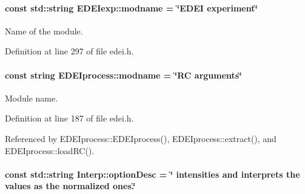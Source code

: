 \hypertarget{group__edeiedei_ga6dfda2e4cb9d61720e2db926b65d6dbe}{
\paragraph[{modname}]{\setlength{\rightskip}{0pt plus 5cm}const std::string {\bf EDEIexp::modname} = \char`\"{}EDEI experiment\char`\"{}}\hfill}
\label{group__edeiedei_ga6dfda2e4cb9d61720e2db926b65d6dbe}


Name of the module. 



Definition at line 297 of file edei.h.

\hypertarget{group__edeiedei_ga32645490331f1049ac7b8be12b72e9fd}{
\paragraph[{modname}]{\setlength{\rightskip}{0pt plus 5cm}const string {\bf EDEIprocess::modname} = \char`\"{}RC arguments\char`\"{}}\hfill}
\label{group__edeiedei_ga32645490331f1049ac7b8be12b72e9fd}


Module name. 



Definition at line 187 of file edei.h.



Referenced by EDEIprocess::EDEIprocess(), EDEIprocess::extract(), and EDEIprocess::loadRC().

\hypertarget{group__edeiedei_gad0a1bf1abf92a9db8a77c55470a31027}{
\paragraph[{optionDesc}]{\setlength{\rightskip}{0pt plus 5cm}const std::string {\bf Interp::optionDesc} = \char`\"{} intensities and interprets the values as the normalized ones.\char`\"{}}\hfill}
\label{group__edeiedei_gad0a1bf1abf92a9db8a77c55470a31027}


